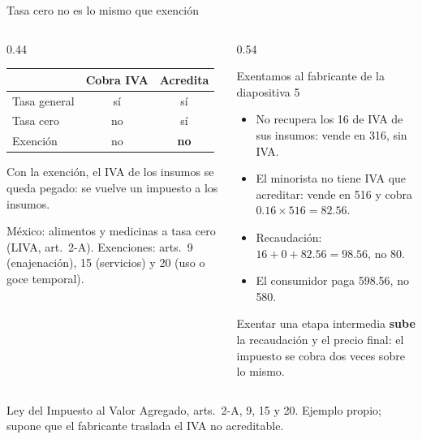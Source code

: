 \documentclass[aspectratio=169,11pt]{beamer}
\newcommand{\fuente}[1]{\par\vfill{\small\color{cGris}#1\par}}
\begin{document}
\begin{frame}{Tasa cero no es lo mismo que exención}
  \begin{columns}[T]
    \begin{column}{0.44\textwidth}
      \centering
      \begin{tabular}{lcc}
        \toprule
        & Cobra IVA & Acredita\\
        \midrule
        Tasa general & sí & sí\\
        Tasa cero & no & sí\\
        Exención & no & \textcolor{cImpuesto}{\textbf{no}}\\
        \bottomrule
      \end{tabular}
      \par\medskip
      \raggedright
      Con la exención, el IVA de los insumos se queda pegado: se vuelve un impuesto a los insumos.
      \par\medskip
      {\small México: alimentos y medicinas a tasa cero (LIVA, art.~2-A). Exenciones: arts.~9 (enajenación), 15 (servicios) y 20 (uso o goce temporal).}
    \end{column}
    \begin{column}{0.54\textwidth}
      \pause
      \begin{block}{Exentamos al fabricante de la diapositiva 5}
        \small
        \begin{itemize}
          \item No recupera los 16 de IVA de sus insumos: vende en 316, sin IVA.
          \item El minorista no tiene IVA que acreditar: vende en 516 y cobra $0.16\times516 = 82.56$.
          \item Recaudación: $16 + 0 + 82.56 = 98.56$, no 80.
          \item El consumidor paga 598.56, no 580.
        \end{itemize}
      \end{block}
      \pause
      Exentar una etapa intermedia \textbf{sube} la recaudación y el precio final: el impuesto se cobra dos veces sobre lo mismo.
    \end{column}
  \end{columns}
  \fuente{Ley del Impuesto al Valor Agregado, arts.~2-A, 9, 15 y 20. Ejemplo propio; supone que el fabricante traslada el IVA no acreditable.}
\end{frame}
\end{document}
